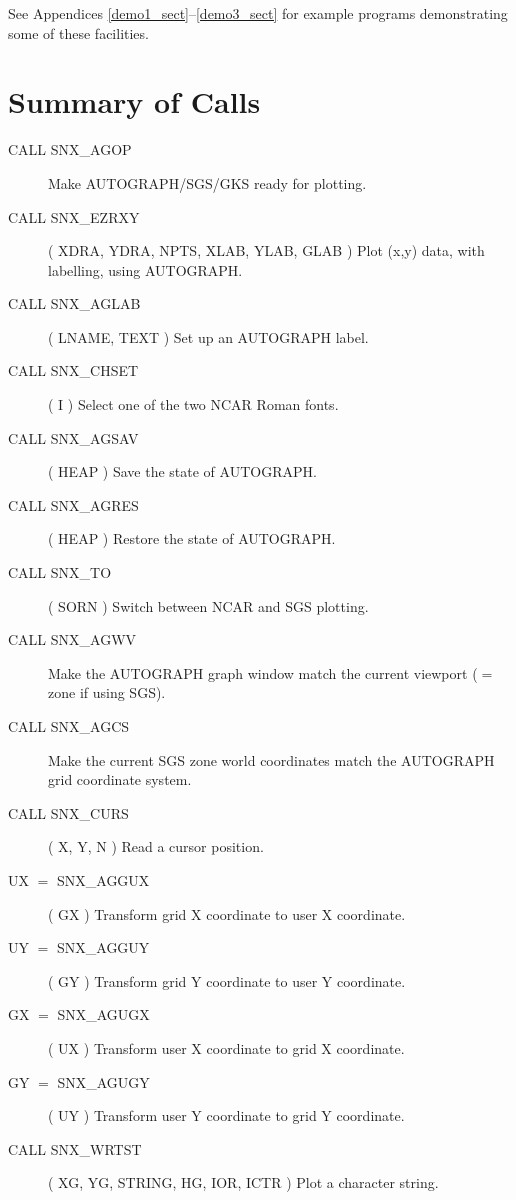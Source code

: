 See Appendices \ref{demo1_sect}--\ref{demo3_sect} for example programs
demonstrating some of these facilities.


\section {Summary of Calls}

\begin{small}
\begin{description}
\item [CALL SNX\_AGOP] \hfill
\subitem Make AUTOGRAPH/SGS/GKS ready for plotting.
\indexspace
\item [CALL SNX\_EZRXY] ( XDRA, YDRA, NPTS, XLAB, YLAB, GLAB )
\subitem Plot (x,y) data, with labelling, using AUTOGRAPH.
\indexspace
\item [CALL SNX\_AGLAB] ( LNAME, TEXT )
\subitem Set up an AUTOGRAPH label.
\indexspace
\item [CALL SNX\_CHSET] ( I )
\subitem Select one of the two NCAR Roman fonts.
\indexspace
\item [CALL SNX\_AGSAV] ( HEAP )
\subitem Save the state of AUTOGRAPH.
\indexspace
\item [CALL SNX\_AGRES] ( HEAP )
\subitem Restore the state of AUTOGRAPH.
\indexspace
\item [CALL SNX\_TO] ( SORN )
\subitem Switch between NCAR and SGS plotting.
\indexspace
\item [CALL SNX\_AGWV] \hfill
\subitem Make the AUTOGRAPH graph window match the current viewport ($=$ zone
if using SGS).
\indexspace
\item [CALL SNX\_AGCS] \hfill
\subitem Make the current SGS zone world coordinates match the AUTOGRAPH grid
coordinate system.
\indexspace
\item [CALL SNX\_CURS] ( X, Y, N )
\subitem Read a cursor position.
\indexspace
\item [UX $=$ SNX\_AGGUX] ( GX )
\subitem Transform grid X coordinate to user X coordinate.
\indexspace
\item [UY $=$ SNX\_AGGUY] ( GY )
\subitem Transform grid Y coordinate to user Y coordinate.
\indexspace
\item [GX $=$ SNX\_AGUGX] ( UX )
\subitem Transform user X coordinate to grid X coordinate.
\indexspace
\item [GY $=$ SNX\_AGUGY] ( UY )
\subitem Transform user Y coordinate to grid Y coordinate.
\indexspace
\item [CALL SNX\_WRTST] ( XG, YG, STRING, HG, IOR, ICTR )
\subitem Plot a character string.
\end{description}
\end{small}

